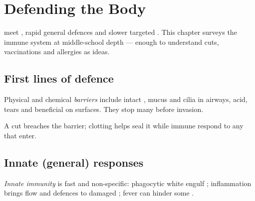 \chapter{Defending the Body}\label{ch:g8:immune}

 meet , rapid general defences and slower targeted
. This chapter surveys the immune system at middle-school depth
--- enough to understand cuts, vaccinations and allergies as ideas.

\section{First lines of defence}

\begin{definition}[Barriers]\label{def:g8:immune:barriers}
Physical and chemical \emph{barriers} include
intact , mucus and cilia in airways,  acid, tears and
beneficial  on surfaces. They stop many  before invasion.
\end{definition}

\begin{example}\label{ex:g8:immune:cut}
A cut breaches the barrier; clotting helps seal it while immune 
respond to any  that enter.
\end{example}

\section{Innate (general) responses}

\begin{definition}\label{def:g8:immune:innate}
\emph{Innate immunity} is fast and non-specific:
phagocytic white   engulf ; inflammation brings 
flow and defences to damaged ; fever can hinder some .
\end{definition}

